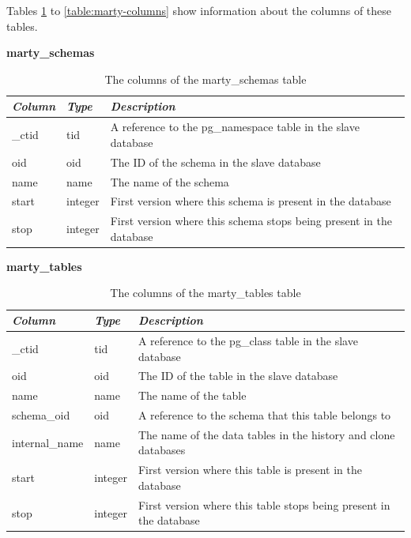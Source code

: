 Tables \ref{table:marty-schemas} to \ref{table:marty-columns} show information about the columns of these tables.

\begin{table}[h]
  \centering
  \textbf{marty\_schemas}
  \begin{tabularx}{\textwidth}{llX}
    \textit{Column} & \textit{Type} & \textit{Description} \\
    \midrule
    \_ctid & tid & A reference to the pg\_namespace table in the slave database \\
    oid & oid & The ID of the schema in the slave database \\
    name & name & The name of the schema \\
    start & integer & First version where this schema is present in the database \\
    stop & integer & First version where this schema stops being present in the database \\
  \end{tabularx}
  \caption{The columns of the marty\_schemas table}
  \label{table:marty-schemas}
\end{table}

\begin{table}[h]
  \centering
  \textbf{marty\_tables}
  \begin{tabularx}{\textwidth}{llX}
    \textit{Column} & \textit{Type} & \textit{Description} \\
    \midrule
    \_ctid & tid & A reference to the pg\_class table in the slave database \\
    oid & oid & The ID of the table in the slave database \\
    name & name & The name of the table \\
    schema\_oid & oid & A reference to the schema that this table belongs to \\
    internal\_name & name & The name of the data tables in the history and clone databases \\
    start & integer & First version where this table is present in the database \\
    stop & integer & First version where this table stops being present in the database \\
  \end{tabularx}
  \caption{The columns of the marty\_tables table}
  \label{table:marty-tables}
\end{table}

